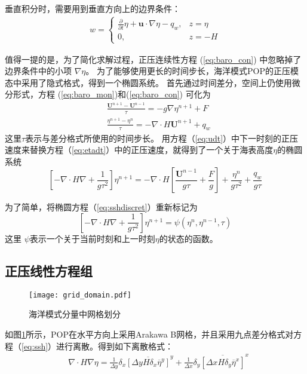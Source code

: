 垂直积分时，需要用到垂直方向上的边界条件：
\begin{align}
\label{eq:bound_w}
w = \left\{ \begin{array}{ll}
\frac{\partial}{\partial t} \eta  +\textbf{u}\cdot\nabla \eta - q_w, & z = \eta  \\
0, & z = -H
\end{array} \right.
\end{align}
 
值得一提的是，为了简化求解过程，正压连续性方程 (\ref{eq:baro_con}) 中忽略掉了边界条件中的小项 $\nabla \eta$\cite{smith2010parallel}。
为了能够使用更长的时间步长，海洋模式POP的正压模态中采用了隐式格式，得到一个椭圆系统。 
首先通过时间差分，空间上仍使用微分形式，方程  (\ref{eq:baro_mon})和(\ref{eq:baro_con}) 可化为
\begin{align}
&\displaystyle \frac{ \textbf{U}^{n+1} - \textbf{U}^{n-1}}{\tau}  = -g \nabla \eta^{n+1} + F \label{eq:udt} \\
&\displaystyle \frac{\eta^{n+1} - \eta^n }{\tau}  = - \nabla \cdot H\textbf{U} ^{n+1}+ q_w \label{eq:etadt}
\end{align}
这里$\tau$表示与差分格式所使用的时间步长。 
用方程（\ref{eq:udt}）中下一时刻的正压速度来替换方程（\ref{eq:etadt}）中的正压速度，就得到了一个关于海表高度$\eta$的椭圆系统
\begin{equation}
\label{eq:sshdiscret}
     [-\nabla\cdot H \nabla + \frac{1}{g  \tau^2}]\eta^{n+1}
           = -\nabla\cdot H[\frac{\textbf{U}^{n-1}}{g \tau} + \frac{F}{g}] + \frac{\eta^n}{g\tau^2} +\frac{q_w}{g\tau}
\end{equation}
 
为了简单，将椭圆方程（\ref{eq:sshdiscret}）重新标记为
\begin{equation}
\label{eq:ssh}
[-\nabla \cdot H\nabla +\frac{1}{g  \tau^2}]\eta^{n+1} = \psi(\eta^n,\eta^{n-1},\tau)
\end{equation}
这里 $\psi$表示一个关于当前时刻和上一时刻$\eta$的状态的函数。
 

\subsection{正压线性方程组}
\label{solver:baroproperty}
\begin{figure}%
\centering
\texttt{[image: grid\_domain.pdf]}
\caption[] {海洋模式分量中网格划分\label{fig:grid1}}
\end{figure}

如图\ref{fig:grid1}所示，POP在水平方向上采用Arakawa B网格\cite{smith2010parallel}，并且采用九点差分格式对方程（\ref{eq:ssh}）进行离散。得到如下离散格式：
\begin{align}
    & \nabla\cdot H \nabla \eta  =\frac{1}{\Delta y}\delta_x \overline{[\Delta y H  \delta_x\overline{\eta}^y]}^y +\frac{1}{\Delta x}\delta_y \overline{[\Delta x H  \delta_y\overline{\eta}^x]}^x \label{eq:nabla2}
  \end{align}

